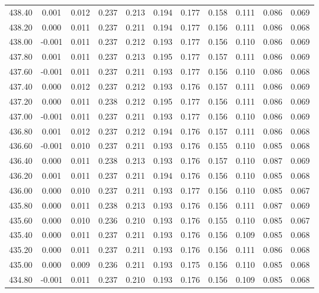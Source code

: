 \begin{longtable}{cccccccccc}
    438.40 &  0.001 &  0.012 &  0.237 &  0.213 &  0.194 &  0.177 &  0.158 &  0.111 &  0.086 &  0.069 \\
    438.20 &  0.000 &  0.011 &  0.237 &  0.211 &  0.194 &  0.177 &  0.156 &  0.111 &  0.086 &  0.068 \\
    438.00 & -0.001 &  0.011 &  0.237 &  0.212 &  0.193 &  0.177 &  0.156 &  0.110 &  0.086 &  0.069 \\
    437.80 &  0.001 &  0.011 &  0.237 &  0.213 &  0.195 &  0.177 &  0.157 &  0.111 &  0.086 &  0.069 \\
    437.60 & -0.001 &  0.011 &  0.237 &  0.211 &  0.193 &  0.177 &  0.156 &  0.110 &  0.086 &  0.068 \\
    437.40 &  0.000 &  0.012 &  0.237 &  0.212 &  0.193 &  0.176 &  0.157 &  0.111 &  0.086 &  0.069 \\
    437.20 &  0.000 &  0.011 &  0.238 &  0.212 &  0.195 &  0.177 &  0.156 &  0.111 &  0.086 &  0.069 \\
    437.00 & -0.001 &  0.011 &  0.237 &  0.211 &  0.193 &  0.177 &  0.156 &  0.110 &  0.086 &  0.069 \\
    436.80 &  0.001 &  0.012 &  0.237 &  0.212 &  0.194 &  0.176 &  0.157 &  0.111 &  0.086 &  0.068 \\
    436.60 & -0.001 &  0.010 &  0.237 &  0.211 &  0.193 &  0.176 &  0.155 &  0.110 &  0.085 &  0.068 \\
    436.40 &  0.000 &  0.011 &  0.238 &  0.213 &  0.193 &  0.176 &  0.157 &  0.110 &  0.087 &  0.069 \\
    436.20 &  0.001 &  0.011 &  0.237 &  0.211 &  0.194 &  0.176 &  0.156 &  0.110 &  0.085 &  0.068 \\
    436.00 &  0.000 &  0.010 &  0.237 &  0.211 &  0.193 &  0.177 &  0.156 &  0.110 &  0.085 &  0.067 \\
    435.80 &  0.000 &  0.011 &  0.238 &  0.213 &  0.193 &  0.176 &  0.156 &  0.111 &  0.087 &  0.069 \\
    435.60 &  0.000 &  0.010 &  0.236 &  0.210 &  0.193 &  0.176 &  0.155 &  0.110 &  0.085 &  0.067 \\
    435.40 &  0.000 &  0.011 &  0.237 &  0.211 &  0.193 &  0.176 &  0.156 &  0.109 &  0.085 &  0.068 \\
    435.20 &  0.000 &  0.011 &  0.237 &  0.211 &  0.193 &  0.176 &  0.156 &  0.111 &  0.086 &  0.068 \\
    435.00 &  0.000 &  0.009 &  0.236 &  0.211 &  0.193 &  0.175 &  0.156 &  0.110 &  0.085 &  0.068 \\
    434.80 & -0.001 &  0.011 &  0.237 &  0.210 &  0.193 &  0.176 &  0.156 &  0.109 &  0.085 &  0.068 \\

\end{longtable}
